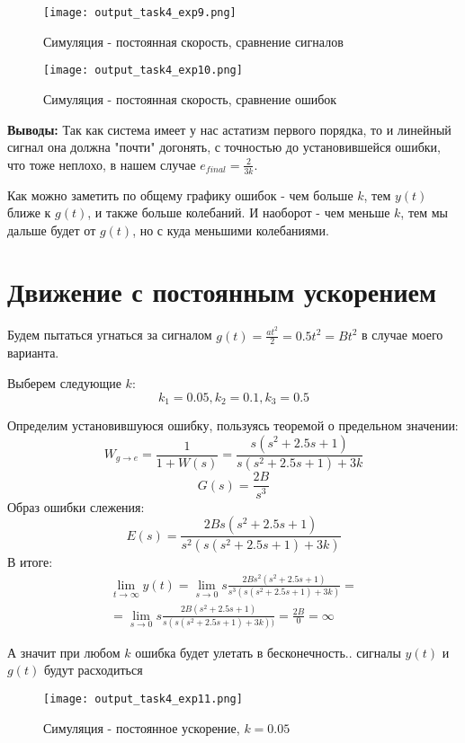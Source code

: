 \newpage
\begin{figure}[ht]
  \centering
  \texttt{[image: output\_task4\_exp9.png]}
\caption{Симуляция - постоянная скорость, сравнение сигналов}
\end{figure}

\begin{figure}[ht]
  \centering
  \texttt{[image: output\_task4\_exp10.png]}
\caption{Симуляция - постоянная скорость, сравнение ошибок}
\end{figure}

\newpage
\textbf{Выводы:} Так как система имеет у нас астатизм первого порядка, то и линейный сигнал она должна "почти" догонять, с точностью до установившейся ошибки,
что тоже неплохо, в нашем случае $e_{final} = \frac{2}{3k}$. 

Как можно заметить по общему графику ошибок - чем больше $k$, тем $y(t)$ ближе к $g(t)$, и также больше колебаний. И наоборот - чем меньше $k$, тем мы дальше будет от $g(t)$, но с куда меньшими колебаниями.


\section{Движение с постоянным ускорением}

Будем пытаться угнаться за сигналом $g(t) = \frac{at^2}{2} = 0.5t^2 = Bt^2$ в случае моего варианта.

Выберем следующие $k$:
$$
k_1 = 0.05, k_2 = 0.1,  k_3 = 0.5
$$

Определим установившуюся ошибку, пользуясь теоремой о предельном значении:
$$
W_{g\to e} = \frac{1}{1+W(s)} = \frac{s(s^2 +2.5s + 1)}{s(s^2 + 2.5s + 1) + 3k}
$$
$$
G(s) = \frac{2B}{s^3}
$$
Образ ошибки слежения:
$$
E(s) = \frac{2Bs(s^2 +2.5s + 1)}{s^2(s(s^2 + 2.5s + 1) + 3k)}
$$
В итоге:
$$
\begin{aligned}
  \lim_{t\to\infty} y(t) = \lim_{s\to 0}s\frac{2Bs^2(s^2 +2.5s + 1)}{s^3(s(s^2 + 2.5s + 1) + 3k)} =  \\
  = \lim_{s\to 0}s\frac{2B(s^2 +2.5s + 1)}{s(s(s^2 + 2.5s + 1) + 3k))} = \frac{2B}{0} = \infty
\end{aligned}
$$

А значит при любом $k$ ошибка будет улетать в бесконечность.. сигналы $y(t)$ и $g(t)$ будут расходиться

\begin{figure}[ht]
  \centering
  \texttt{[image: output\_task4\_exp11.png]}
\caption{Симуляция - постоянное ускорение, $k=0.05$}
\end{figure}

